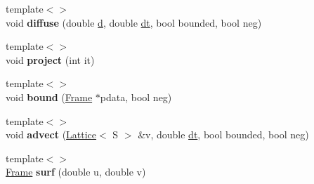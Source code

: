 \begin{DoxyCompactItemize}
\item 
\hypertarget{classvsr_1_1_lattice_a6bd436f7f680921c2267ab35646f4535}{{\footnotesize template$<$$>$ }\\void {\bfseries diffuse} (double \hyperlink{classvsr_1_1_lattice_a5ee2e0d41d22764521a812a82074886b}{d}, double \hyperlink{classvsr_1_1_frame_a4a81e06d0bdede9557e9ee4333c8f6a0}{dt}, bool bounded, bool neg)}\label{classvsr_1_1_lattice_a6bd436f7f680921c2267ab35646f4535}

\item 
\hypertarget{classvsr_1_1_lattice_ae40b95a7adefb027bf87f12efd195dd6}{{\footnotesize template$<$$>$ }\\void {\bfseries project} (int it)}\label{classvsr_1_1_lattice_ae40b95a7adefb027bf87f12efd195dd6}

\item 
\hypertarget{classvsr_1_1_lattice_aa505fbdc9c0e75e1da282e50d6b04029}{{\footnotesize template$<$$>$ }\\void {\bfseries bound} (\hyperlink{classvsr_1_1_frame}{Frame} $\ast$pdata, bool neg)}\label{classvsr_1_1_lattice_aa505fbdc9c0e75e1da282e50d6b04029}

\item 
\hypertarget{classvsr_1_1_lattice_a8164283418c6238a3c4ba7c16bb37286}{{\footnotesize template$<$$>$ }\\void {\bfseries advect} (\hyperlink{classvsr_1_1_lattice}{Lattice}$<$ S $>$ \&v, double \hyperlink{classvsr_1_1_frame_a4a81e06d0bdede9557e9ee4333c8f6a0}{dt}, bool bounded, bool neg)}\label{classvsr_1_1_lattice_a8164283418c6238a3c4ba7c16bb37286}

\item 
\hypertarget{classvsr_1_1_lattice_a998168c4f0d4d1b82a09892d3e828c09}{{\footnotesize template$<$$>$ }\\\hyperlink{classvsr_1_1_frame}{Frame} {\bfseries surf} (double u, double v)}\label{classvsr_1_1_lattice_a998168c4f0d4d1b82a09892d3e828c09}

\end{DoxyCompactItemize}
